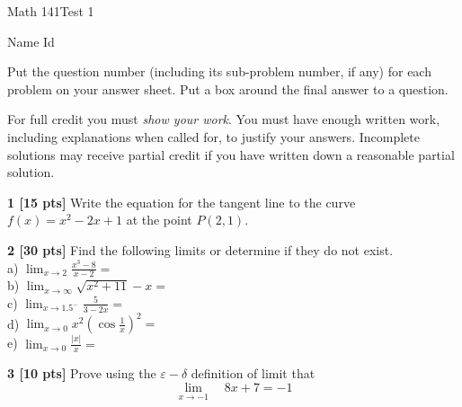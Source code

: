 \documentclass[12pt]{article}
\newcommand{\nd}{\noindent}
\begin{document}
\begin{large}
\begin{bf}
\hspace{1.5in}
\parbox{2.0in}{Math 141\quad Test 1}%
\hspace{1in}
\parbox{1in}{ Name \newline Id}
\end{bf}
\end{large}

\vspace{0.2in}

\nd
Put the question number (including its sub-problem number, if any) for each 
problem on your answer sheet. 
Put a box around the final answer to a question.

\vspace*{.02in}\nd
For full credit you must \emph{show your work}. You must have enough
written work, including explanations when called for, to justify your
answers. Incomplete solutions may receive partial credit if you have
written down a reasonable partial solution. %
                                         

\vspace{0.25in}
\noindent
{\bf 1 [15 pts]}  Write the equation for the tangent line
to the curve
$\displaystyle{f(x) = x^2-2x + 1}$ at the
point $\displaystyle{P(2,1)}$.


\vspace{.15in}
\noindent 
{\bf 2 [30 pts]}  Find the following limits or determine if they do not exist.
\\
a) $\displaystyle{\lim_{x\to 2}\frac{x^3-8}{x-2}=}$\\
b) $\displaystyle{\lim_{x\to \infty} \sqrt{x^2+11}-x =}$\\
c) $\displaystyle{\lim_{x\to 1.5^-}\frac{5}{3-2x}=}$\\
d) $\displaystyle{\lim_{x\to 0}x^2\left(\cos \frac{1}{x}\right)^2=}$
\\ 
e) $\displaystyle{\lim_{x\to 0}\frac{\vert x \vert}{x}=}$ 


\vspace{.15in}
\noindent
{\bf 3 [10 pts]} Prove using the $\varepsilon-\delta$ definition of limit
that
$$
\lim_{x\rightarrow -1}\quad 8x+7 =-1
$$
\end{document}
